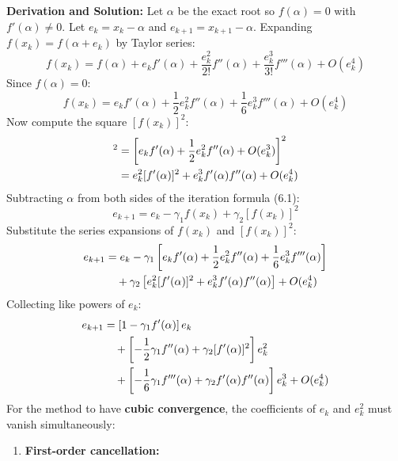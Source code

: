 \documentclass[11pt,a4paper]{article}
\numberwithin{equation}{section}
\begin{document}
\begin{solbox}
\textbf{Derivation and Solution:}
Let $\alpha$ be the exact root so $f(\alpha) = 0$ with $f'(\alpha) \ne 0$. Let $e_k = x_k - \alpha$ and $e_{k+1} = x_{k+1} - \alpha$.
Expanding $f(x_k) = f(\alpha + e_k)$ by Taylor series:
\begin{equation}
    f(x_k) = f(\alpha) + e_k f'(\alpha) + \frac{e_k^2}{2!} f''(\alpha) + \frac{e_k^3}{3!} f'''(\alpha) + O(e_k^4)
\end{equation}
Since $f(\alpha) = 0$:
\begin{equation}
    f(x_k) = e_k f'(\alpha) + \frac{1}{2} e_k^2 f''(\alpha) + \frac{1}{6} e_k^3 f'''(\alpha) + O(e_k^4)
\end{equation}
Now compute the square $[f(x_k)]^2$:
\begin{align}
    [f(x_k)]^2 &= \left[ e_k f'(\alpha) + \frac{1}{2} e_k^2 f''(\alpha) + O(e_k^3) \right]^2 \notag \\
    &= e_k^2 [f'(\alpha)]^2 + e_k^3 f'(\alpha) f''(\alpha) + O(e_k^4)
\end{align}
Subtracting $\alpha$ from both sides of the iteration formula (6.1):
\begin{equation}
    e_{k+1} = e_k - \gamma_1 f(x_k) + \gamma_2 [f(x_k)]^2
\end{equation}
Substitute the series expansions of $f(x_k)$ and $[f(x_k)]^2$:
\begin{align}
    e_{k+1} &= e_k - \gamma_1 \left[ e_k f'(\alpha) + \frac{1}{2} e_k^2 f''(\alpha) + \frac{1}{6} e_k^3 f'''(\alpha) \right] \notag \\
    &\quad + \gamma_2 \left[ e_k^2 [f'(\alpha)]^2 + e_k^3 f'(\alpha) f''(\alpha) \right] + O(e_k^4)
\end{align}
Collecting like powers of $e_k$:
\begin{align}
    e_{k+1} &= \left[ 1 - \gamma_1 f'(\alpha) \right] e_k \notag \\
    &\quad + \left[ -\frac{1}{2} \gamma_1 f''(\alpha) + \gamma_2 [f'(\alpha)]^2 \right] e_k^2 \notag \\
    &\quad + \left[ -\frac{1}{6} \gamma_1 f'''(\alpha) + \gamma_2 f'(\alpha) f''(\alpha) \right] e_k^3 + O(e_k^4)
\end{align}
For the method to have \textbf{cubic convergence}, the coefficients of $e_k$ and $e_k^2$ must vanish simultaneously:
\begin{enumerate}[leftmargin=2em]
    \item \textbf{First-order cancellation:}
    \begin{equation}

\end{equation}
\end{enumerate}
\end{solbox}
\end{document}
